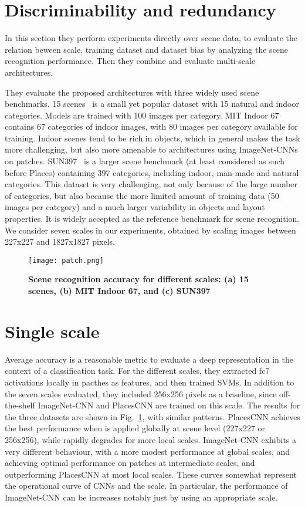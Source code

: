 \documentclass[10pt,twocolumn,letterpaper]{article}
\begin{document}
 \section{Discriminability and redundancy}
In this section they perform experiments directly over scene data, to evaluate the relation beween scale, training dataset and dataset bias by analyzing the scene recognition performance. Then they combine and evaluate multi-scale architectures.
\par They evaluate the proposed architectures with three widely used scene benchmarks. 15 scenes~\cite{name6} is a small yet popular dataset with 15 natural and indoor categories. Models are trained with 100 images per category. MIT Indoor 67~\cite{name9} contains 67 categories of indoor images, with 80 images per category available for training. Indoor scenes tend to be rich in objects, which in general makes the task more challenging, but also more amenable to architectures using ImageNet-CNNs on patches. SUN397~\cite{name18,name19} is a larger scene benchmark (at least considered as such before Places) containing 397 categories, including indoor, man-made and natural categories. This dataset is very challenging, not only because of the large number of categories, but also because the more limited amount of training data (50 images per category) and a much larger variability in objects and layout properties. It is widely accepted as the reference benchmark for scene recognition. We consider seven scales in our experiments, obtained by scaling images between 227x227 and 1827x1827 pixels.
\begin{figure}[!htb]
 \centering
 \texttt{[image: patch.png]}\\
 \caption{ \textbf{Scene recognition accuracy for different scales: (a) 15 scenes, (b) MIT Indoor 67, and (c) SUN397}}\label{Figure3}
 \end{figure}
\section{Single scale}
Average accuracy is a reasonable metric to evaluate a deep representation in the context of a classification task. For the different scales, they extracted fc7 activations locally in pacthes as features, and then trained SVMs.
In addition to the seven scales evaluated, they included 256x256 pixels as a baseline, since off-the-shelf ImageNet-CNN and PlacesCNN are trained on this scale. The results for the three datasets are shown in Fig.~\ref{Figure3}, with similar patterns. PlacesCNN achieves the best performance when is applied globally at scene level (227x227 or 256x256), while rapidly degrades for more local scales. ImageNet-CNN exhibits a very different behaviour, with a more modest performance at global scales, and achieving optimal performance on patches at intermediate scales, and outperforming PlacesCNN at most local scales. These curves somewhat represent the operational curve of CNNs and the scale. In particular, the performance of ImageNet-CNN can be increases notably just by using an appropriate scale.
\end{document}
